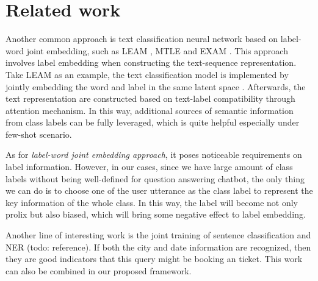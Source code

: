 \section{Related work}

Another  common  approach  is  text  classification  neural  network  based on
label-word     joint     embedding,    such    as    LEAM \cite{wang2018joint},
MTLE \cite{zhang2017multi}   and   EXAM \cite{du2019explicit}.   This   approach
involves  label  embedding when constructing the text-sequence representation.
Take  LEAM  as  an  example,  the  text classification model is implemented by
jointly    embedding    the    word    and    label   in   the   same   latent
space \cite{wang2018joint}. Afterwards, the text representation are constructed
based  on  text-label  compatibility through attention mechanism. In this way,
additional  sources  of  semantic  information  from class labels can be fully
leveraged, which is quite helpful especially under few-shot scenario.

As for \emph{label-word joint
embedding  approach},  it  poses  noticeable requirements on label information.
However,  in  our  cases,  since  we have large amount of class labels without
being well-defined for question answering chatbot, the only thing we can do is
to  choose  one  of the user utterance as the class label to represent the key
information  of  the  whole class. In this way, the label will become not only
prolix  but  also  biased,  which  will  bring  some  negative effect to label
embedding.  

Another   line   of  interesting  work  is  the  joint  training  of  sentence
classification   and  NER  (todo:  reference).  If  both  the  city  and  date
information  are  recognized,  then  they  are good indicators that this query
might  be  booking  an  ticket. This work can also be combined in our proposed
framework.

